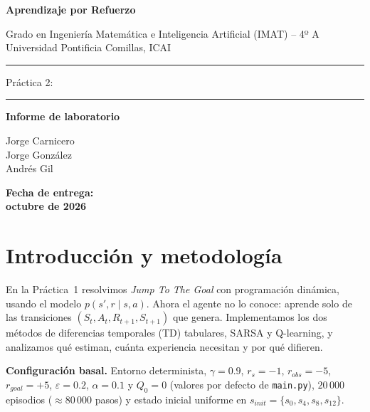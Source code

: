 \documentclass[11pt,a4paper]{article}
\begin{document}
\begin{titlepage}\centering
{\large\bfseries Aprendizaje por Refuerzo\par}\vspace{2mm}
Grado en Ingeniería Matemática e Inteligencia Artificial (IMAT) -- 4º A\\ Universidad Pontificia Comillas, ICAI\par
\vspace{2.2cm}\rule{\textwidth}{0.6pt}\par\vspace{4mm}
{\LARGE Práctica 2:\par}\vspace{2mm}{\Large\bfseries RL tabular sin modelo:\\ SARSA y Q-learning\par}
\vspace{4mm}\rule{\textwidth}{0.6pt}\par\vspace{2cm}
{\large\bfseries Informe de laboratorio\par}\vspace{2cm}
Jorge Carnicero\\ Jorge González\\ Andrés Gil\par\vspace{1cm}
{\bfseries Fecha de entrega:\\ octubre de 2026\par}
\vfill
\begin{minipage}{0.92\textwidth}\small\tableofcontents\end{minipage}
\end{titlepage}

\section{Introducción y metodología}

En la Práctica~1 resolvimos \emph{Jump To The Goal} con programación dinámica, usando el modelo $p(s',r\mid s,a)$. Ahora el agente no lo conoce: aprende solo de las transiciones $(S_t,A_t,R_{t+1},S_{t+1})$ que genera. Implementamos los dos métodos de diferencias temporales (TD) tabulares, SARSA y Q-learning, y analizamos qué estiman, cuánta experiencia necesitan y por qué difieren.

\textbf{Configuración basal.} Entorno determinista, $\gamma=0.9$, $r_s=-1$, $r_{obs}=-5$, $r_{goal}=+5$, $\varepsilon=0.2$, $\alpha=0.1$ y $Q_0=0$ (valores por defecto de \texttt{main.py}), $20\,000$ episodios ($\approx 80\,000$ pasos) y estado inicial uniforme en $s_{init}=\{s_0,s_4,s_8,s_{12}\}$.
\end{document}
